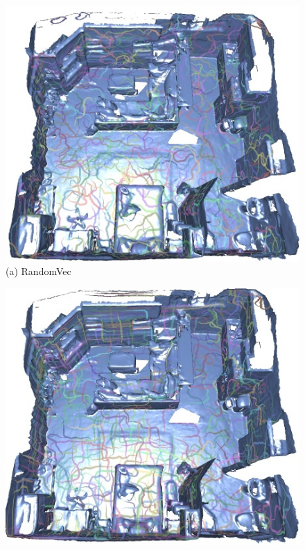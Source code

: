 \begin{figure}
    \centering
    \begin{minipage}{0.24\linewidth}
    \centering
    \includegraphics[width=\linewidth]{texturenet/field/random.jpg}
    (a) RandomVec
    \end{minipage}
    \begin{minipage}{0.24\linewidth}
    \centering
    \includegraphics[width=\linewidth]{texturenet/field/eigen.jpg}

\end{minipage}
\end{figure}

